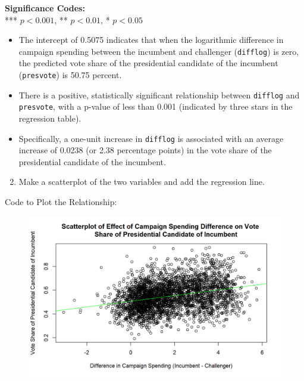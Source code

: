 \documentclass[12pt,letterpaper]{article}
\begin{document}
\vspace{0.1cm}
\noindent\textbf{Significance Codes:} \\
*** $p < 0.001$, ** $p < 0.01$, * $p < 0.05$

\vspace{0.5cm} \begin{itemize}[left=0pt, label=\textbullet]
	\item The intercept of 0.5075 indicates that when the logarithmic difference in campaign spending between the incumbent and challenger (\texttt{difflog}) is zero, the predicted vote share of the presidential candidate of the incumbent (\texttt{presvote}) is 50.75 percent.
	
	\item There is a positive, statistically significant relationship between \texttt{difflog} and \texttt{presvote}, with a p-value of less than 0.001 (indicated by three stars in the regression table).
	
	\item Specifically, a one-unit increase in \texttt{difflog} is associated with an average increase of 0.0238 (or 2.38 percentage points) in the vote share of the presidential candidate of the incumbent.
\end{itemize}
\newpage
\vspace{0.5cm}\noindent\begin{enumerate}[left=0pt]	
\setcounter{enumi}{1}	
		\item Make a scatterplot of the two variables and add the regression line.
\end{enumerate}

\noindent Code to Plot the Relationship:

\begin{figure}[H]
	\centering
	\includegraphics[width=1\textwidth]{Figure_2_1.png}
\end{figure}
\end{document}
